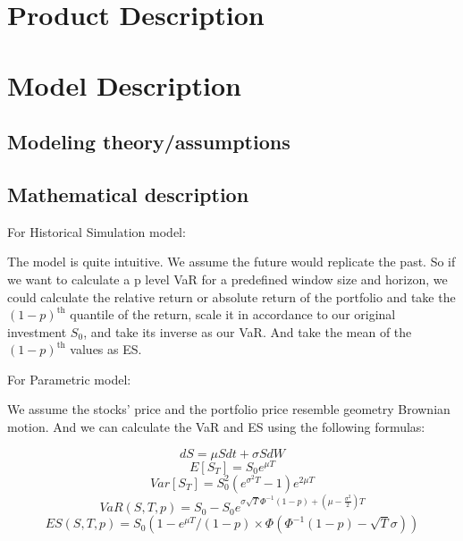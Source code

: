 \documentclass[letterpaper,11pt, oneside]{layout}
\begin{document}
\begingroup
\renewcommand{\clearpage}{}
\chapter{Product Description}
\label{chap:pd}
\endgroup


\begingroup
\renewcommand{\clearpage}{}
\chapter{Model Description}
\label{chap:md}
\endgroup

\section{Modeling theory/assumptions}
\label{sec:md:mt}

\section{Mathematical description}
\label{sec:md:md}

For Historical Simulation model: 

The model is quite intuitive. We assume the future would replicate the past. So if we want to calculate a p level VaR for a predefined window size and horizon, we could calculate the relative return or absolute return of the portfolio and take the $(1-p)^{\text{th}}$ quantile of the return, scale it in accordance to our original investment $S_0$, and take its inverse as our VaR. And take the mean of the $(1-p)^{\text{th}}$ values as ES.

For Parametric model:

We assume the stocks’ price and the portfolio price resemble geometry Brownian motion. And we can calculate the VaR and ES using the following formulas:

\begin{equation}
dS=\mu Sdt+\sigma SdW
\end{equation}
\begin{equation}
E[S_T]=S_0 e^{\mu T}
\end{equation}
\begin{equation}
Var[S_T]=S_0^2( e^{\sigma^2 T}-1)e^{2\mu T}
\end{equation}
\begin{equation}
VaR(S, T, p)=S_0-S_0 e^{\sigma\sqrt{T}\Phi^{-1}(1-p)+ (\mu-\frac{\sigma^2}{2})T}
\end{equation}
\begin{equation}
ES(S, T, p)=S_0(1-e^{\mu T}/(1-p)\times\Phi(\Phi^{-1}(1-p)-\sqrt{T}\sigma))
\end{equation}
\end{document}
